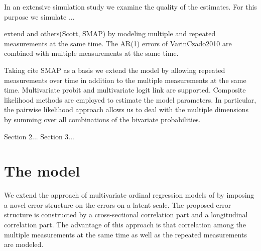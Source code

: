 \documentclass{article}
\begin{document}
In an extensive simulation study we examine the quality of the estimates. For this purpose we simulate ...



extend \cite{Varin09} and others(Scott, SMAP) by modeling multiple and repeated measurements at the same time. The AR(1) errors of VarinCzado2010 are combined with multiple measurements at the same time.

Taking cite SMAP as a basis we extend the model by allowing repeated measurements over time in addition to the multiple measurements at the same time.
Multivariate probit and multivariate logit link are supported. Composite likelihood methods are employed to estimate the model parameters. In particular, the pairwise likelihood approach allows us to deal with the multiple dimensions by summing over all combinations of the bivariate probabilities.


Section 2... Section 3...

\section{The model}
We extend the approach of multivariate ordinal regression models of \cite{pub:mvord:Hirk+Hornik+Vana:2020} by imposing a novel error structure on the errors on a latent scale. The proposed error structure is constructed by a cross-sectional correlation part and a longitudinal correlation part. The advantage of this approach is that correlation among the multiple measurements at the same time as well as the repeated measurements are modeled.
\end{document}
